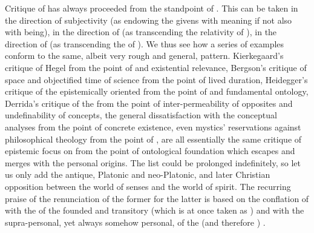 

%


\pa Critique of  has always proceeded from the standpoint of
. This can be taken in the direction of {subjectivity} (as
endowing the  givens with meaning if not also with being), in
the direction of  (as transcending the relativity of \herenow),
in the direction of  
(as transcending the  of ).
We thus see how a series of examples conform to the same, albeit very
rough and general, pattern.  Kierkegaard's critique of Hegel from the point of
 and existential relevance, Bergson's critique of
space and objectified time of science from the point of lived duration, Heidegger's
critique of the epistemically oriented  from the
point of  and fundamental ontology,
Derrida's critique of the
 from the point of 
inter-permeability of opposites and 
undefinability of concepts, the general dissatisfaction with the 
conceptual analyses from the point of concrete existence, even mystics' reservations
against philosophical theology from the point of , are all
essentially the same critique of epistemic focus on  from the
point of ontological foundation which escapes  and merges with
the personal origins. The list could be prolonged indefinitely, so let us only
add the antique, Platonic and neo-Platonic, and later Christian opposition
between the world of senses and the world of spirit. The recurring praise of the
renunciation of the former for the latter is based on the conflation of
 with the  of the founded and transitory
(which is at once taken as ) and  with the
supra-personal, yet always somehow personal,  of the
 (and therefore ) .

